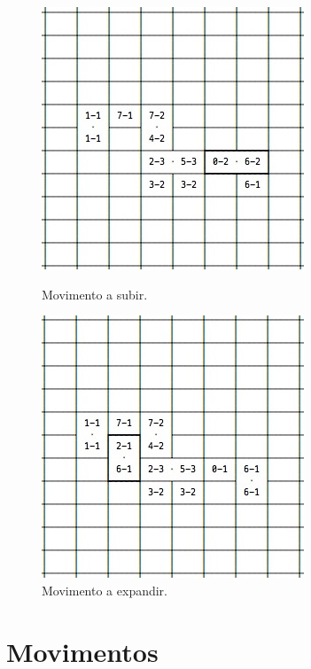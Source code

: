 \documentclass[a4paper]{article}
\begin{document}
\begin{figure}[ht]
 \begin{minipage}[t]{.5\textwidth}
	\begin{center}
		\includegraphics[scale=0.6]{inter_climb.jpg}
		\caption{Movimento a subir.}
		\label{inter_climb}
	\end{center}
 \end{minipage}
 \begin{minipage}[t]{.5\textwidth}
	\begin{center}
		\includegraphics[scale=0.6]{inter_expand.jpg}
		\caption{Movimento a expandir.}
		\label{inter_expand}
	\end{center}
 \end{minipage}
\end{figure}

\section{Movimentos}
\end{document}
